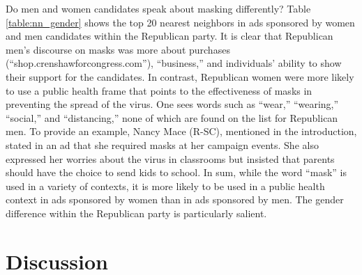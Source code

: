 Do men and women candidates speak about masking differently?  Table \ref{table:nn_gender} shows the top 20 nearest neighbors in ads sponsored by women and men candidates within the Republican party. It is clear that Republican men's discourse on masks was more about purchases (``shop.crenshawforcongress.com''), ``business,'' and individuals' ability to show their support for the candidates. In contrast, Republican women were more likely to use a public health frame that points to the effectiveness of masks in preventing the spread of the virus.  One sees words such as ``wear,'' ``wearing,'' ``social,'' and ``distancing,''  none of which are found on the list for Republican men.  To provide an example, Nancy Mace (R-SC), mentioned in the introduction, stated in an ad that she required masks at her campaign events. She also expressed her worries about the virus in classrooms but insisted that parents should have the choice to send kids to school. In sum, while the word ``mask'' is used in a variety of contexts, it is more likely to be used in a public health context in ads sponsored by women than in ads sponsored by men. The gender difference within the Republican party is particularly salient.



\begin{table}[!htbp]
\caption{Top 20 Nearest Neighbors for the Target Term ``Mask'' by Candidates' Party}
    \centering
    
\label{table:nn_party}
\end{table}

\begin{table}[!htbp]
    \caption{Top 20 nearest neighbors for the target term {\tt mask} by candidates' gender}
    \centering
    
    \label{table:nn_gender}
\end{table}

\begin{table}[!htbp]
    \caption{Top 20 nearest neighbors for the target term {\tt mask} by candidates' gender within the Republican party}
    \centering
    
    \label{table:nn_party_gender}
\end{table}




\section*{Discussion}

